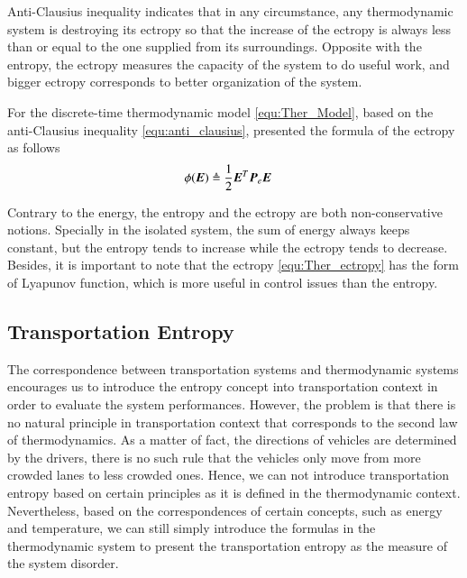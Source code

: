 \documentclass[preprint,authoryear,12pt]{elsarticle}
\renewcommand{\vec}[1]{\mbox{\boldmath$#1$}}
\newcommand{\mat}[1]{\mbox{\boldmath$#1$}}
\begin{document}
Anti-Clausius inequality indicates that in any circumstance, any
thermodynamic system is destroying its ectropy so that the increase
of the ectropy is always less than or equal to the one supplied from
its surroundings. Opposite with the entropy, the ectropy measures the
capacity of the system to do useful work, and bigger ectropy
corresponds to better organization of the system.

For the discrete-time thermodynamic model \eqref{equ:Ther_Model},
based on the anti-Clausius inequality \eqref{equ:anti_clausius},
\citet{haddad_thermodynamic_2005} presented the formula of the
ectropy as follows
\begin{align}
\phi(\vec{E})&\triangleq\frac{1}{2}\vec{E}^T \mat{P}_e \vec{E}
\label{equ:Ther_ectropy}
\end{align}

Contrary to the energy, the entropy and the ectropy are both
non-conservative notions. Specially in the isolated system, the sum
of energy always keeps constant, but the entropy tends to increase
while the ectropy tends to decrease. Besides, it is important to note
that the ectropy \eqref{equ:Ther_ectropy} has the form of Lyapunov
function, which is more useful in control issues than the entropy.

\subsection{Transportation Entropy}
The correspondence between transportation systems and thermodynamic
systems encourages us to introduce the entropy concept into
transportation context in order to evaluate the system performances.
However, the problem is that there is no natural principle in
transportation context that corresponds to the second law of
thermodynamics. As a matter of fact, the directions of vehicles are
determined by the drivers, there is no such rule that the vehicles
only move from more crowded lanes to less crowded ones. Hence, we can
not introduce transportation entropy based on certain principles as
it is defined in the thermodynamic context. Nevertheless, based on
the correspondences of certain concepts, such as energy and
temperature, we can still simply introduce the formulas in the
thermodynamic system to present the transportation entropy as the
measure of the system disorder.
\end{document}
